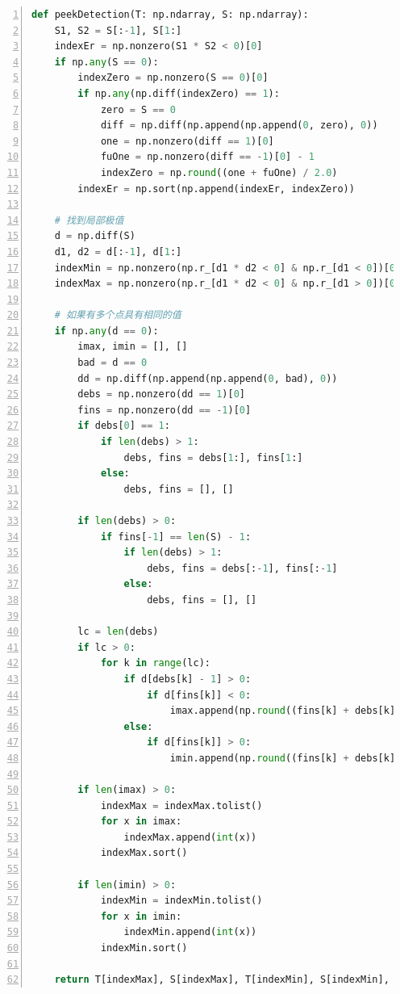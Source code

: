 \documentclass[cs4size,a4paper]{ctexart}
\numberwithin{equation}{section}
\numberwithin{table}{section}
\numberwithin{figure}{section}
\begin{document}
\begin{lstlisting}[language={python},
numbers=left,
numberstyle=\tiny\monaco,
basicstyle=\footnotesize\monaco]
def peekDetection(T: np.ndarray, S: np.ndarray):
    S1, S2 = S[:-1], S[1:]
    indexEr = np.nonzero(S1 * S2 < 0)[0]
    if np.any(S == 0):
        indexZero = np.nonzero(S == 0)[0]
        if np.any(np.diff(indexZero) == 1):
            zero = S == 0
            diff = np.diff(np.append(np.append(0, zero), 0))
            one = np.nonzero(diff == 1)[0]
            fuOne = np.nonzero(diff == -1)[0] - 1
            indexZero = np.round((one + fuOne) / 2.0)
        indexEr = np.sort(np.append(indexEr, indexZero))

    # 找到局部极值
    d = np.diff(S)
    d1, d2 = d[:-1], d[1:]
    indexMin = np.nonzero(np.r_[d1 * d2 < 0] & np.r_[d1 < 0])[0] + 1
    indexMax = np.nonzero(np.r_[d1 * d2 < 0] & np.r_[d1 > 0])[0] + 1

    # 如果有多个点具有相同的值
    if np.any(d == 0):
        imax, imin = [], []
        bad = d == 0
        dd = np.diff(np.append(np.append(0, bad), 0))
        debs = np.nonzero(dd == 1)[0]
        fins = np.nonzero(dd == -1)[0]
        if debs[0] == 1:
            if len(debs) > 1:
                debs, fins = debs[1:], fins[1:]
            else:
                debs, fins = [], []

        if len(debs) > 0:
            if fins[-1] == len(S) - 1:
                if len(debs) > 1:
                    debs, fins = debs[:-1], fins[:-1]
                else:
                    debs, fins = [], []

        lc = len(debs)
        if lc > 0:
            for k in range(lc):
                if d[debs[k] - 1] > 0:
                    if d[fins[k]] < 0:
                        imax.append(np.round((fins[k] + debs[k]) / 2.0))
                else:
                    if d[fins[k]] > 0:
                        imin.append(np.round((fins[k] + debs[k]) / 2.0))

        if len(imax) > 0:
            indexMax = indexMax.tolist()
            for x in imax:
                indexMax.append(int(x))
            indexMax.sort()

        if len(imin) > 0:
            indexMin = indexMin.tolist()
            for x in imin:
                indexMin.append(int(x))
            indexMin.sort()

    return T[indexMax], S[indexMax], T[indexMin], S[indexMin], indexEr  # 局部最大值的下标、局部最大值、局部最小值的坐标、局部最小值、index

\end{lstlisting}
\end{document}
